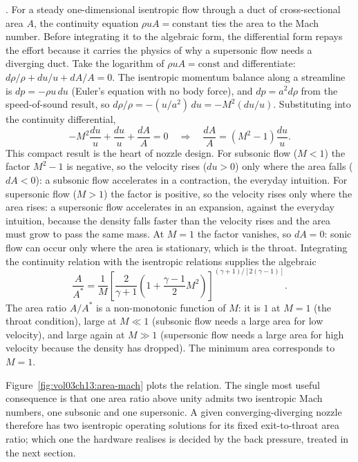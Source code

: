 . For a steady one-dimensional
isentropic flow through a duct of cross-sectional area $A$, the
continuity equation $\rho u A = \text{constant}$ ties the area to
the Mach number. Before integrating it to the algebraic form, the
differential form repays the effort because it carries the physics
of why a supersonic flow needs a diverging duct. Take the logarithm
of $\rho u A = \text{const}$ and differentiate: $d\rho/\rho + du/u
+ dA/A = 0$. The isentropic momentum balance along a streamline is
$dp = -\rho u\,du$ (Euler's equation with no body force), and $dp =
a^2 d\rho$ from the speed-of-sound result, so $d\rho/\rho =
-(u/a^2)\,du = -M^2 (du/u)$. Substituting into the continuity
differential,
\[
-M^2\frac{du}{u} + \frac{du}{u} + \frac{dA}{A} = 0
\quad\Longrightarrow\quad
\frac{dA}{A} = (M^2 - 1)\frac{du}{u}.
\]
This compact result is the heart of nozzle design. For subsonic
flow ($M < 1$) the factor $M^2 - 1$ is negative, so the velocity
rises ($du > 0$) only where the area falls ($dA < 0$): a subsonic
flow accelerates in a contraction, the everyday intuition. For
supersonic flow ($M > 1$) the factor is positive, so the velocity
rises only where the area rises: a supersonic flow accelerates in
an expansion, against the everyday intuition, because the density
falls faster than the velocity rises and the area must grow to pass
the same mass. At $M = 1$ the factor vanishes, so $dA = 0$: sonic
flow can occur only where the area is stationary, which is the
throat. Integrating the continuity relation with the isentropic
relations supplies the algebraic 
\[
\frac{A}{A^*} = \frac{1}{M}\left[\frac{2}{\gamma + 1}\left(1 +
\frac{\gamma - 1}{2}M^2\right)\right]^{(\gamma + 1)/[2(\gamma -
1)]}.
\]
The area ratio $A/A^*$ is a non-monotonic function of $M$: it is
$1$ at $M = 1$ (the throat condition), large at $M \ll 1$
(subsonic flow needs a large area for low velocity), and large
again at $M \gg 1$ (supersonic flow needs a large area for high
velocity because the density has dropped). The minimum area
corresponds to $M = 1$.



Figure~\ref{fig:vol03ch13:area-mach} plots the relation. The single
most useful consequence is that one area ratio above unity admits two
isentropic Mach numbers, one subsonic and one supersonic. A given
converging-diverging nozzle therefore has two isentropic operating
solutions for its fixed exit-to-throat area ratio; which one the
hardware realises is decided by the back pressure, treated in the
next section.

